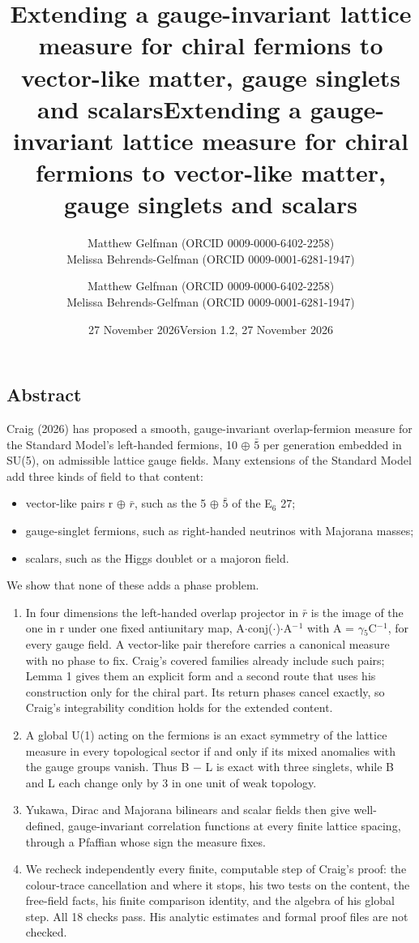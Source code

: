\documentclass[
  11pt,
]{article}
\title{Extending a gauge-invariant lattice measure for chiral fermions to vector-like matter, gauge singlets and scalars}
\author{Matthew Gelfman (ORCID 0009-0000-6402-2258) \\ Melissa Behrends-Gelfman (ORCID 0009-0001-6281-1947)}
\date{27 November 2026}
\title{Extending a gauge-invariant lattice measure for chiral fermions to
vector-like matter, gauge singlets and scalars}
\author{Matthew Gelfman (ORCID 0009-0000-6402-2258) \\ Melissa Behrends-Gelfman (ORCID 0009-0001-6281-1947)}
\date{Version 1.2, 27 November 2026}
\newcounter{none} %
\providecommand{\tightlist}{%
  \setlength{\itemsep}{0pt}\setlength{\parskip}{0pt}}
\begin{document}
\maketitle
\hypertarget{abstract}{%
\subsection{Abstract}\label{abstract}}

Craig (2026) has proposed a smooth, gauge-invariant overlap-fermion measure for the Standard Model's left-handed fermions, 10 \ensuremath{\oplus} \ensuremath{\bar{5}} per generation embedded in SU(5), on admissible lattice gauge fields. Many extensions of the Standard Model add three kinds of field to that content:

\begin{itemize}
\tightlist
\item
  vector-like pairs r \ensuremath{\oplus} \ensuremath{\bar{r}}, such as the 5 \ensuremath{\oplus} \ensuremath{\bar{5}} of the E\ensuremath{_{6}} 27;
\item
  gauge-singlet fermions, such as right-handed neutrinos with Majorana masses;
\item
  scalars, such as the Higgs doublet or a majoron field.
\end{itemize}

We show that none of these adds a phase problem.

\begin{enumerate}
\def\labelenumi{(\roman{enumi})}
\item
  In four dimensions the left-handed overlap projector in \ensuremath{\bar{r}} is the image of the one in r under one fixed antiunitary map, A\ensuremath{\cdot}conj(\ensuremath{\cdot})\ensuremath{\cdot}A\ensuremath{^{-}}\ensuremath{^{1}} with A = \ensuremath{\gamma}\ensuremath{_{5}}C\ensuremath{^{-}}\ensuremath{^{1}}, for every gauge field. A vector-like pair therefore carries a canonical measure with no phase to fix. Craig's covered families already include such pairs; Lemma 1 gives them an explicit form and a second route that uses his construction only for the chiral part. Its return phases cancel exactly, so Craig's integrability condition holds for the extended content.
\item
  A global U(1) acting on the fermions is an exact symmetry of the lattice measure in every topological sector if and only if its mixed anomalies with the gauge groups vanish. Thus B \ensuremath{-} L is exact with three singlets, while B and L each change only by 3 in one unit of weak topology.
\item
  Yukawa, Dirac and Majorana bilinears and scalar fields then give well-defined, gauge-invariant correlation functions at every finite lattice spacing, through a Pfaffian whose sign the measure fixes.
\item
  We recheck independently every finite, computable step of Craig's proof: the colour-trace cancellation and where it stops, his two tests on the content, the free-field facts, his finite comparison identity, and the algebra of his global step. All 18 checks pass. His analytic estimates and formal proof files are not checked.
\end{enumerate}
\end{document}

